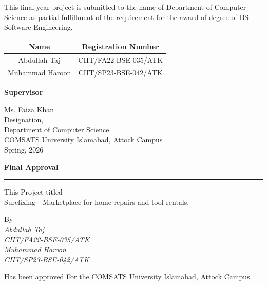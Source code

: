 \documentclass[A4paper,12pt]{report}
\theoremstyle{plain}
\theoremstyle{definition}
\theoremstyle{remark}
\numberwithin{equation}{section}
\begin{document}
\onehalfspacing\noindent\large{This final year project is submitted to the name of Department of Computer Science as partial fulfillment of the requirement for the award of degree of
BS Software Engineering.}
\vspace{0.4in}
\begin{table}[ht!]
\centering
{\setlength{\arrayrulewidth}{0.7mm}
\setlength{\tabcolsep}{45pt}
\renewcommand{\arraystretch}{2.5}
\begin{tabular}{|c|c|}
\hline
\rowcolor[HTML]{656565}
 \large{Name} &\large{Registration Number}  \\
 \hline
 Abdullah Taj  & CIIT/FA22-BSE-035/ATK \\ \hline

 Muhammad Haroon & CIIT/SP23-BSE-042/ATK \\ \hline
\end{tabular}
}
\end{table}
\FloatBarrier
\vspace{2in}

\noindent\large{\textbf{Supervisor}}
\begin{flushleft}
\vspace{0.3in}
\large{Ms. Faiza Khan\\
\vspace{0.1in}
Designation,\\
Department of Computer Science\\
\vspace{0.1in}
COMSATS University Islamabad, Attock Campus\\

\vspace{0.2in}
Spring, 2026 }
\end{flushleft}



\newpage
\begin{center}
\Large{\textbf{{Final Approval}}}
\par\noindent\rule{\textwidth}{0.6pt}
\end{center}

\begin{center}
\normalsize {This Project titled}\\
\vspace{0.05in}
\LARGE{Surefixing - Marketplace for home repairs and tool rentals.}\\
\vspace{0.5in}

\normalsize{By}\\
\vspace{0.5in}
\large{\textit{Abdullah Taj}\\
{\textit{CIIT/FA22-BSE-035/ATK}}}\\
\large{\textit{Muhammad Haroon}\\
{\textit{CIIT/SP23-BSE-042/ATK}}}\\
\vspace{0.5in}

\normalsize{Has been approved For the COMSATS University Islamabad, Attock Campus.}\\
\end{center}
\end{document}
